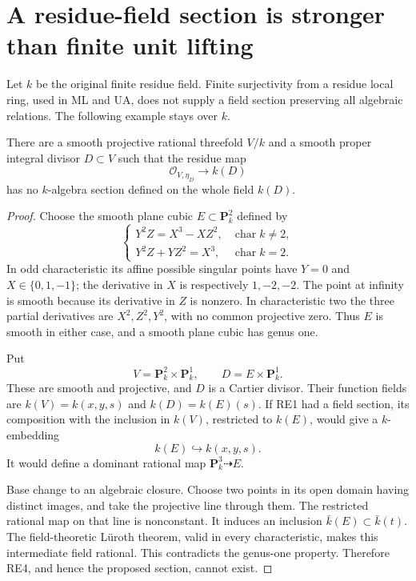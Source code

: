 \section{A residue-field section is stronger than finite unit lifting}
\label{sec:r13-residue-field-section-obstruction}

Let \(k\) be the original finite residue field.  Finite
surjectivity from a residue local ring, used in ML and UA,
does not supply a field section preserving all algebraic
relations.  The following example stays over \(k\).

\begin{proposition}
\label{prop:r13-no-rational-residue-field-section}
There are a smooth projective rational threefold \(V/k\)
and a smooth proper integral divisor \(D\subset V\) such
that the residue map
\[
             \mathcal O_{V,\eta_D}\longrightarrow k(D)
\tag{RE1}
\]
has no \(k\)-algebra section defined on the whole field
\(k(D)\).
\end{proposition}

\begin{proof}
Choose the smooth plane cubic \(E\subset\mathbf P^2_k\)
defined by
\[
 \begin{cases}
 Y^2Z=X^3-XZ^2,&\operatorname{char}k\ne2,\\
 Y^2Z+YZ^2=X^3,&\operatorname{char}k=2.
 \end{cases}
\tag{RE2}
\]
In odd characteristic its affine possible singular
points have \(Y=0\) and \(X\in\{0,1,-1\}\);
the derivative in \(X\) is respectively \(1,-2,-2\).
The point at infinity is smooth because its derivative
in \(Z\) is nonzero.  In characteristic two the three
partial derivatives are \(X^2,Z^2,Y^2\), with no
common projective zero.  Thus \(E\) is smooth in
either case, and a smooth plane cubic has genus one.

Put
\[
 V=\mathbf P^2_k\times\mathbf P^1_k,
 \qquad D=E\times\mathbf P^1_k.
\tag{RE3}
\]
These are smooth and projective, and \(D\) is a
Cartier divisor.  Their function fields are
\(k(V)=k(x,y,s)\) and \(k(D)=k(E)(s)\).
If RE1 had a field section, its composition with
the inclusion in \(k(V)\), restricted to \(k(E)\),
would give a \(k\)-embedding
\[
                         k(E)\hookrightarrow k(x,y,s).
\tag{RE4}
\]
It would define a dominant rational map
\(\mathbf P^3_k\dashrightarrow E\).

Base change to an algebraic closure.  Choose two
points in its open domain having distinct images,
and take the projective line through them.  The
restricted rational map on that line is nonconstant.
It induces an inclusion
\(\bar k(E)\subset\bar k(t)\).  The field-theoretic
L\"uroth theorem, valid in every characteristic,
makes this intermediate field rational.  This
contradicts the genus-one property.  Therefore
RE4, and hence the proposed section, cannot exist.
\end{proof}

